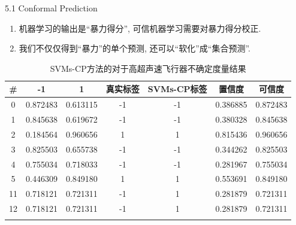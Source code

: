 \documentclass[compress,10pt,dvipsnames,notheorems]{beamer} %
\begin{document}
\begin{frame}{5.1 Conformal Prediction}
\begin{enumerate}
\item 机器学习的输出是“暴力得分”, 可信机器学习需要对暴力得分校正.
\item 我们不仅仅得到“暴力”的单个预测, 还可以“软化”成“集合预测”.
\end{enumerate}

\begin{table}[]
\centering
\caption{SVMs-CP方法的对于高超声速飞行器不确定度量结果}
\label{tab:cp-svm}
\begin{tabular}{@{}ccccccc@{}}
\toprule
\#  & -1        & 1        & 真实标签 & SVMs-CP标签 & 置信度 & 可信度 \\ \midrule
0	&0.872483	&0.613115	&-1	&-1	&0.386885	&0.872483\\
1	&0.845638	&0.619672	&-1	&-1	&0.380328	&0.845638\\
2	&0.184564	&0.960656	&1	&1	&0.815436	&0.960656\\
3	&0.825503	&0.655738	&-1	&-1	&0.344262	&0.825503\\
4	&0.755034	&0.718033	&-1	&-1	&0.281967	&0.755034\\
5	&0.446309	&0.849180	&1	&1	&0.553691	&0.849180\\
11	&0.718121	&0.721311	&-1	&1	&0.281879	&0.721311\\
12	&0.718121	&0.721311	&-1	&1	&0.281879	&0.721311\\
\bottomrule
\multicolumn{1}{l}{} & \multicolumn{1}{l}{} & \multicolumn{1}{l}{} & \multicolumn{1}{l}{} & \multicolumn{1}{l}{} & \multicolumn{1}{l}{} & \multicolumn{1}{l}{}
\end{tabular}
\end{table}
\end{frame}
\end{document}

